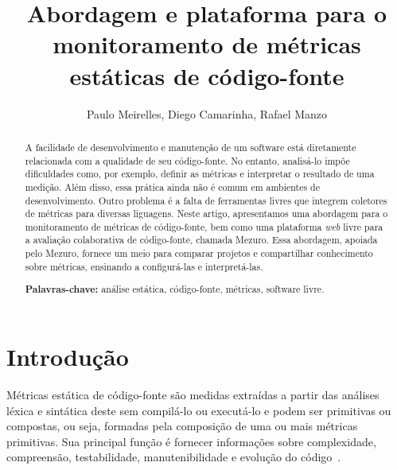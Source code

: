 \documentclass{llncs}
\begin{document}
\sloppy
\title{Abordagem e plataforma para o monitoramento de métricas estáticas de código-fonte}

\author{Paulo Meirelles, Diego Camarinha, Rafael Manzo}


\maketitle


\begin{abstract}

A facilidade de desenvolvimento e manutenção de um software está
diretamente relacionada com a qualidade de seu código-fonte.
No entanto, analisá-lo impõe dificuldades como, por exemplo, definir as
métricas e interpretar o resultado de uma medição. Além disso, essa prática
ainda não é comum em ambientes de desenvolvimento. Outro problema é a falta de
ferramentas livres que integrem coletores de métricas para diversas liguagens.
Neste artigo, apresentamos uma abordagem para o monitoramento de métricas de
código-fonte, bem como uma plataforma \textit{web} livre para a avaliação
colaborativa de código-fonte, chamada Mezuro. Essa abordagem, apoiada pelo
Mezuro, fornece um meio para comparar projetos e compartilhar conhecimento
sobre métricas, ensinando a configurá-las e interpretá-las.

\textbf{Palavras-chave:} análise estática, código-fonte, métricas, software
livre.

\end{abstract}


\section{Introdução}
\label{sec:intro}

Métricas estática de código-fonte são medidas extraídas a partir das análises
léxica e sintática deste sem compilá-lo ou executá-lo e podem ser primitivas ou
compostas, ou seja, formadas pela composição de uma ou mais métricas
primitivas. Sua principal função é fornecer informações sobre complexidade,
compreensão, testabilidade, manutenibilidade e evolução do
código~\cite{Henderson-Sellers96,Sato07}.
\end{document}
